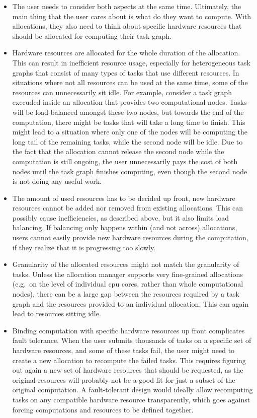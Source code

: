 \begin{itemize}
    \item The user needs to consider both aspects at the same time. Ultimately, the main thing that the user
    cares about is what do they want to compute. With allocations, they also need to think about
    specific hardware resources that should be allocated for computing their task graph.
    \item Hardware resources are allocated for the whole duration of the allocation. This can result in
    inefficient resource usage, especially for heterogeneous task graphs that consist of many types of
    tasks that use different resources. In situations where not all resources can be used at the same
    time, some of the resources can unnecessarily sit idle. For example, consider a task graph execuded
    inside an allocation that provides two computational nodes. Tasks will be load-balanced
    amongst these two nodes, but towards the end of the computation, there might be tasks that will
    take a long time to finish. This might lead to a situation where only one of the nodes will be
    computing the long tail of the remaining tasks, while the second node will be idle. Due to the fact
    that the allocation cannot release the second node while the computation is still ongoing, the user
    unnecessarily pays the cost of both nodes until the task graph finishes computing, even though
    the second node is not doing any useful work.

    \item The amount of used resources has to be decided up front, new hardware resources cannot be added nor
    removed from existing allocations. This can possibly cause inefficiencies, as described above, but
    it also limits load balancing. If balancing only happens within (and not across) allocations, users
    cannot easily provide new hardware resources during the computation, if they realize that it is
    progressing too slowly.
    \item Granularity of the allocated resources might not match the granularity of tasks. Unless the
    allocation manager supports very fine-grained allocations (e.g.\ on the level of individual
    \gls{cpu} cores, rather than whole computational nodes), there can be a large gap
    between the resources required by a task graph and the resources provided to an individual
    allocation. This can again lead to resources sitting idle.
    \item Binding computation with specific hardware resources up front complicates fault tolerance. When the
    user submits thousands of tasks on a specific set of hardware resources, and some of these tasks
    fail, the user might need to create a new allocation to recompute the failed tasks. This requires
    figuring out again a new set of hardware resources that should be requested, as the original
    resources will probably not be a good fit for just a subset of the original computation. A
    fault-tolerant design would ideally allow recomputing tasks on any compatible hardware resource
    transparently, which goes against forcing computations and resources to be defined together.
\end{itemize}

